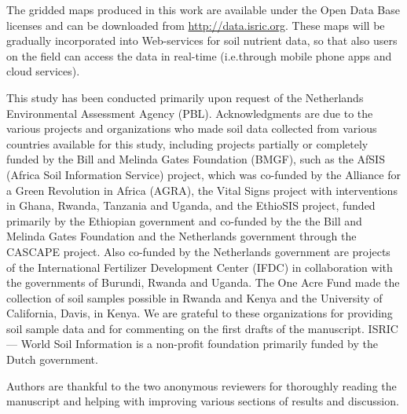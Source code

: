 \begin{linenumbers}
The gridded maps produced in this work are available under the Open Data Base licenses and can be downloaded from \url{http://data.isric.org}. These maps will be gradually incorporated into Web-services for soil nutrient data, so that also users on the field can access the data in real-time (i.e.\@ through mobile phone apps and cloud services). \par

\begin{acknowledgements}
This study has been conducted primarily upon request of the Netherlands Environmental Assessment Agency (PBL). Acknowledgments are due to the various projects and organizations who made soil data collected from various countries available for this study, including projects partially or completely funded by the Bill and Melinda Gates Foundation (BMGF), such as the AfSIS (Africa Soil Information Service) project, which was co-funded by the Alliance for a Green Revolution in Africa (AGRA), the Vital Signs project with interventions in Ghana, Rwanda, Tanzania and Uganda, and the EthioSIS project, funded primarily by the Ethiopian government and co-funded by the the Bill and Melinda Gates Foundation and the Netherlands government through the CASCAPE project. Also co-funded by the Netherlands government are projects of the International Fertilizer Development Center (IFDC) in collaboration with the governments of Burundi, Rwanda and Uganda. The One Acre Fund made the collection of soil samples possible in Rwanda and Kenya and the University of California, Davis, in Kenya. We are grateful to these organizations for providing soil sample data and for commenting on the first drafts of the manuscript. ISRIC --- World Soil Information is a non-profit foundation primarily funded by the Dutch government.\par
Authors are thankful to the two anonymous reviewers for thoroughly reading the manuscript and helping with improving various sections of results and discussion.
\end{acknowledgements}


\end{linenumbers}


